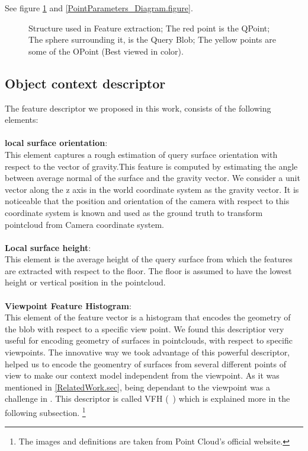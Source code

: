 See figure \ref{FEStructure.figure} and \ref{PointParameters_Diagram.figure}.

\begin{figure}[t]
  \caption[Illustration of the items used in Feature Extract.]
  {Structure used in Feature extraction; The red point is the QPoint; The sphere surrounding it, is the Query Blob; The yellow
  points are some of the OPoint (Best viewed in color).}
  \label{FEStructure.figure}
\end{figure}



\subsection{Object context descriptor}
\label{OCD.ssec}
 
The feature descriptor we proposed in this work, consists of the following elements:\\
\\
{\bf local surface orientation}:\\
This element captures a rough estimation of query surface orientation with respect to the vector of gravity.This feature is computed by estimating the angle between average normal of the surface and the gravity vector. We consider a unit vector along the z axis in the world coordinate system as the gravity vector. It is noticeable that the position and orientation of the camera with respect to this coordinate system is known and used as
the ground truth to transform pointcloud from Camera coordinate system.\\
\\
{\bf Local surface height}:\\
This element is the average height of the query surface from which the features are extracted with respect to the floor. The floor is assumed to have the lowest height or vertical position in the pointcloud.\\
\\
{\bf Viewpoint Feature Histogram}:\\
This element of the feature vector is a histogram that encodes the geometry of the blob with respect to a specific view point. We found this descriptior very useful for encoding geometry of surfaces in pointclouds, with respect to specific viewpoints. The innovative way we took advantage of this powerful descriptor, helped us to encode the geomentry of surfaces from several different points of view to make our context model independent from the viewpoint. As it was mentioned in \ref{RelatedWork.sec}, being dependant to the viewpoint was a challenge in \cite{aydemir2012_3Dcontext}.
This descriptor is called VFH (~\cite{5651280}) which is explained more in the following subsection. \footnote{The images and definitions are taken from Point Cloud's official website.}

